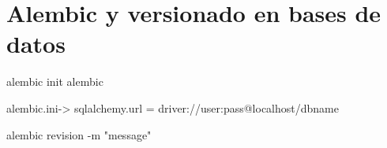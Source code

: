 






\section{Alembic y versionado en bases de datos}


alembic init alembic

alembic.ini-> sqlalchemy.url = driver://user:pass@localhost/dbname

alembic revision -m "message"




